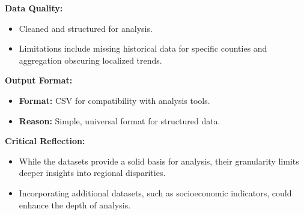 \documentclass[a4paper,12pt]{article}
\begin{document}
\textbf{Data Quality:}
\begin{itemize}
    \item Cleaned and structured for analysis.
    \item Limitations include missing historical data for specific counties and aggregation obscuring localized trends.
\end{itemize}

\textbf{Output Format:}
\begin{itemize}
    \item \textbf{Format:} CSV for compatibility with analysis tools.
    \item \textbf{Reason:} Simple, universal format for structured data.
\end{itemize}

\textbf{Critical Reflection:}
\begin{itemize}
    \item While the datasets provide a solid basis for analysis, their granularity limits deeper insights into regional disparities.
    \item Incorporating additional datasets, such as socioeconomic indicators, could enhance the depth of analysis.
\end{itemize}
\end{document}
